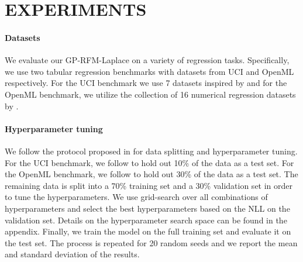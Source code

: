 \section{EXPERIMENTS}

\paragraph{Datasets}
We evaluate our GP-RFM-Laplace on a variety of regression tasks.
Specifically, we use two tabular regression benchmarks with datasets from UCI \citep{asuncion2007uci} and OpenML \citep{vanschoren2014openml} respectively.
For the UCI benchmark we use 7 datasets inspired by \citet{duan2020ngboost} and
for the OpenML benchmark, we utilize the collection of 16 numerical regression datasets by \citet{grinsztajn2022tree}.

\paragraph{Hyperparameter tuning}
We follow the protocol proposed in \citet{hernandez2015probabilistic} for data splitting and hyperparameter tuning.
For the UCI benchmark, we follow \citet{duan2020ngboost} to hold out 10\% of the data as a test set.
For the OpenML benchmark, we follow \citet{grinsztajn2022tree} to hold out 30\% of the data as a test set.
The remaining data is split into a 70\% training set and a 30\% validation set in order to tune the hyperparameters.
We use grid-search over all combinations of hyperparameters and select the best hyperparameters based on the NLL on the validation set.
Details on the hyperparameter search space can be found in the appendix.
Finally, we train the model on the full training set and evaluate it on the test set.
The process is repeated for 20 random seeds and we report the mean and standard deviation of the results.

